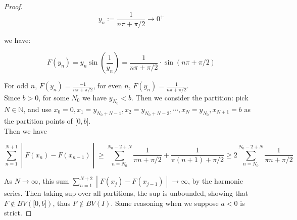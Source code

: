 \documentclass{qlnotes-export}
\begin{document}
\begin{proof}
\[y_{n} := \frac{1}{n\pi + \pi/2}\rightarrow 0^{+}\]

we have:

\[F\left( y_{n} \right) = y_{n}\sin\left( \frac{1}{y_{n}} \right) = \frac{1}{n\pi + \pi/2} \cdot \sin(n\pi + \pi/2)\]

For odd \(n\), \(F(y_{n}) = \frac{- 1}{n\pi + \pi/2}\), for even \(n\), \(F(y_{n}) = \frac{1}{n\pi + \pi/2}\).\\
Since \(b > 0\), for some \(N_{0}\) we have \(y_{N_{0}} < b\). Then we consider the partition: pick \(N \in {\mathbb{N}}\), and use \(x_{0} = 0,x_{1} = y_{N_{0} + N - 1},x_{2} = y_{N_{0} + N - 2},\cdots,x_{N} = y_{N_{0}},x_{N + 1} = b\) as the partition points of \(\lbrack 0,b\rbrack\).\\
Then we have

\[\left. \sum\limits_{n = 1}^{N + 1} \middle| F(x_{n}) - F(x_{n - 1}) \middle| \geq \sum\limits_{n = N_{0}}^{N_{0} - 2 + N}\frac{1}{\pi n + \pi/2} + \frac{1}{\pi(n + 1) + \pi/2} \geq 2\sum\limits_{n = N_{0}}^{N_{0} - 2 + N}\frac{1}{\pi n + \pi/2} \right.\]

As \(N\rightarrow\infty\), this sum \(\left. \sum_{n = 1}^{N + 2} \middle| F(x_{j}) - F(x_{j - 1}) \middle| \rightarrow\infty \right.\), by the harmonic series. Then taking sup over all partitions, the sup is unbounded, showing that \(F \notin BV(\lbrack 0,b\rbrack)\), thus \(F \notin BV(I)\). Same reasoning when we suppose \(a < 0\) is strict.

\end{proof}
\end{document}

